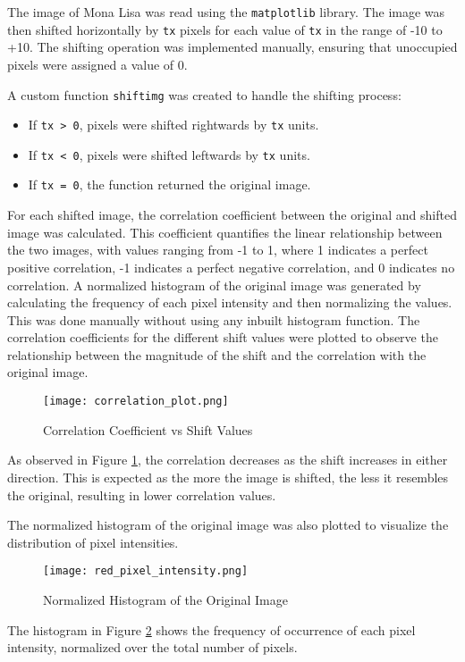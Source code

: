 \begin{tcolorbox}[breakable]
	\begin{sol}
		The image of Mona Lisa was read using the \texttt{matplotlib}
		library. The image was then shifted horizontally by \texttt{tx}
		pixels for each value of \texttt{tx} in the range of -10 to
		+10. The shifting operation was implemented manually, ensuring
		that unoccupied pixels were assigned a value of 0.

		A custom function \texttt{shiftimg} was created to handle the shifting process:
		\begin{itemize}
			\item If \texttt{tx > 0}, pixels were shifted
			      rightwards by \texttt{tx} units.
			\item If \texttt{tx < 0}, pixels were shifted leftwards
			      by \texttt{tx} units.
			\item If \texttt{tx = 0}, the function returned the
			      original image.
		\end{itemize}

		For each shifted image, the correlation coefficient between the
		original and shifted image was calculated. This coefficient
		quantifies the linear relationship between the two images, with
		values ranging from -1 to 1, where 1 indicates a perfect
		positive correlation, -1 indicates a perfect negative
		correlation, and 0 indicates no correlation.
		A normalized histogram of the original image was generated by
		calculating the frequency of each pixel intensity and then
		normalizing the values. This was done manually without using
		any inbuilt histogram function.
		The correlation coefficients for the different shift values
		were plotted to observe the relationship between the magnitude
		of the shift and the correlation with the original image.

		\begin{figure}[H]
			\centering
			\texttt{[image: correlation\_plot.png]}
			\caption{Correlation Coefficient vs Shift Values}
			\label{fig:corr_plot}
		\end{figure}


		As observed in Figure \ref{fig:corr_plot}, the correlation
		decreases as the shift increases in either direction. This is
		expected as the more the image is shifted, the less it
		resembles the original, resulting in lower correlation values.

		The normalized histogram of the original image was also plotted
		to visualize the distribution of pixel intensities.

		\begin{figure}[H]
			\centering
			\texttt{[image: red\_pixel\_intensity.png]}
			\caption{Normalized Histogram of the Original Image}
			\label{fig:hist_plot}
		\end{figure}

		The histogram in Figure \ref{fig:hist_plot} shows the frequency
		of occurrence of each pixel intensity, normalized over the
		total number of pixels.

	\end{sol}
\end{tcolorbox}

